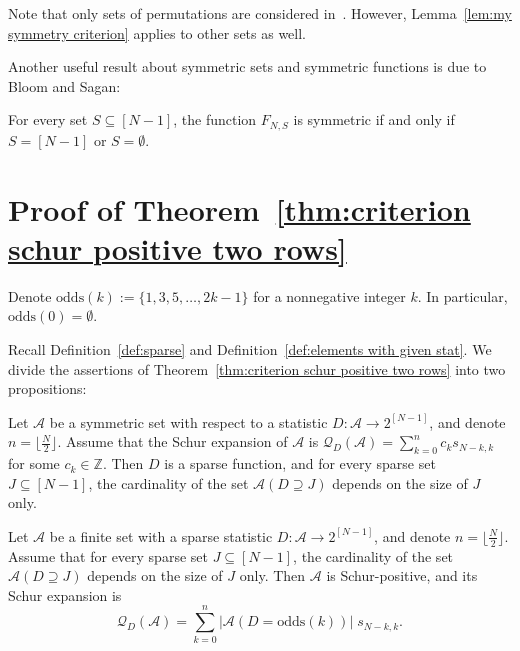 \documentclass[ALCO]{cedram}
\newcommand{\ZZ}{\mathbb{Z}}
\newcommand{\Q}{\mathcal{Q}}
\newcommand{\A}{\mathcal{A}}
\newcommand{\odds}{\mathrm{odds}}
\begin{document}
Note that only sets of permutations are considered in~\cite{my_pattern_theorem}. However, Lemma~\ref{lem:my symmetry criterion} applies to other sets as well.



    

    

Another useful result about symmetric sets and symmetric functions is due to Bloom and Sagan:
\begin{lemma}
\label{lem:singleton not symmetric}
    
    For every set $S \subseteq [N-1]$, the function $F_{N,S}$ is symmetric if and only if $S=[N-1]$ or $S=\emptyset$.
\end{lemma}


\section{Proof of Theorem~\ref{thm:criterion schur positive two rows}}
\label{sec:criterion two rows}

Denote $\odds(k) := \{1,3,5,\dots, 2k-1\}$ for a nonnegative integer $k$. In particular, $\odds(0) = \emptyset$.

Recall Definition~\ref{def:sparse} and Definition~\ref{def:elements with given stat}. We divide the assertions of Theorem~\ref{thm:criterion schur positive two rows} into two propositions:
\begin{lemma}
\label{lem:if schur positive two rows then sparse and good sizes}
    Let $\A$ be a symmetric set with respect to a statistic $D:\A \to 2^{[N-1]}$, and denote $n = \lfloor\frac{N}{2} \rfloor$. Assume that the Schur expansion of $\A$ is $\Q_{D}(\A) = \sum_{k=0}^n c_k s_{N-k,k}$ for some $c_k \in \ZZ$. Then
    $D$ is a sparse function, and for every sparse set $J \subseteq [N-1]$, the cardinality of the set $\A(D \supseteq J)$ depends on the size of $J$ only.
\end{lemma}
\begin{lemma}
\label{lem:if sparse and good sizes then schur positive two rows}
    Let $\A$ be a finite set with a sparse statistic $D:\A \to 2^{[N-1]}$, and denote $n = \lfloor\frac{N}{2} \rfloor$. Assume that for every sparse set $J \subseteq [N-1]$, the cardinality of the set $\A(D \supseteq J)$ depends on the size of $J$ only.
    Then $\A$ is Schur-positive, and its Schur expansion is
    \[
        \Q_{D} (\A) = \sum_{k=0}^n |\A(D=\odds(k))|\; s_{N-k,k}.
    \]
\end{lemma}
\end{document}
